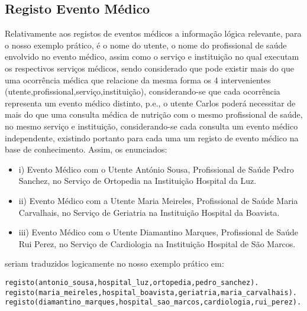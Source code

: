 \documentclass[
  oneside,
  10pt, a4paper,
  footinclude=true,
  headinclude=true,
  cleardoublepage=empty
]{scrbook}
\begin{document}
        \subsection{Registo Evento Médico}
Relativamente aos registos de eventos médicos a informação lógica relevante, para o nosso exemplo prático, é o nome do utente, o nome do profissional de saúde envolvido no evento médico, assim como o serviço e instituição no qual executam os respectivos serviços médicos, sendo considerado que pode existir mais do que uma ocorrência médica que relacione da mesma forma os 4 intervenientes (utente,profissional,serviço,instituição), considerando-se que cada ocorrência representa um evento médico distinto, p.e., o utente Carlos poderá necessitar de mais do que uma consulta médica de nutrição com o mesmo profissional de saúde, no mesmo serviço e instituição, considerando-se cada consulta um evento médico independente, existindo portanto para cada uma um registo de evento médico na base de conhecimento. 
        Assim, os enunciados:
\begin{itemize}
\item i) Evento Médico com o Utente António Sousa, Profissional de Saúde Pedro Sanchez, no Serviço de Ortopedia na Instituição Hospital da Luz.
\item ii) Evento Médico com a Utente Maria Meireles, Profissional de Saúde Maria Carvalhais, no Serviço de Geriatria na Instituição Hospital da Boavista.
\item iii) Evento Médico com o Utente Diamantino Marques, Profissional de Saúde Rui Perez, no Serviço de Cardiologia na Instituição Hospital de São Marcos.
\end{itemize}
seriam traduzidos logicamente  no nosso exemplo prático em:
\begin{lstlisting}
registo(antonio_sousa,hospital_luz,ortopedia,pedro_sanchez).
registo(maria_meireles,hospital_boavista,geriatria,maria_carvalhais).
registo(diamantino_marques,hospital_sao_marcos,cardiologia,rui_perez).
\end{lstlisting}
\end{document}
